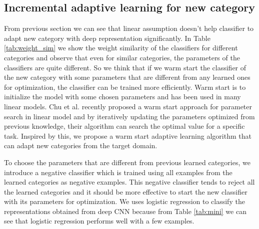\subsection{Incremental adaptive learning for new category}
From previous section we can see that linear assumption doesn't help classifier to adapt new category with deep representation significantly.
In Table \ref{tab:weight_sim} we show the weight similarity of the classifiers for different categories and observe that even for similar categories, the parameters of the classifiers are quite different. So we think that if we warm start the classifier of the new category with some parameters that are different from any learned ones for optimization, the classifier can be trained more efficiently. Warm start is to initialize the model with some chosen parameters and has been used in many linear models.
Chu et al. recently proposed a warm start approach for parameter search in linear model and by iteratively updating the parameters optimized from previous knowledge, their algorithm can search the optimal value for a specific task\cite{chuwarm}. Inspired by this, we propose a warm start adaptive learning algorithm that can adapt new categories from the target domain.%

To choose the parameters that are different from previous learned categories, we introduce a negative classifier which is trained using all examples from the learned categories as negative examples. This negative classifier tends to reject all the learned categories and it should be more effective to start the new classifier with its parameters for optimization. We uses logistic regression to classify the representations obtained from deep CNN because from Table \ref{tab:mini} we can see that logistic regression performs well with a few examples.

